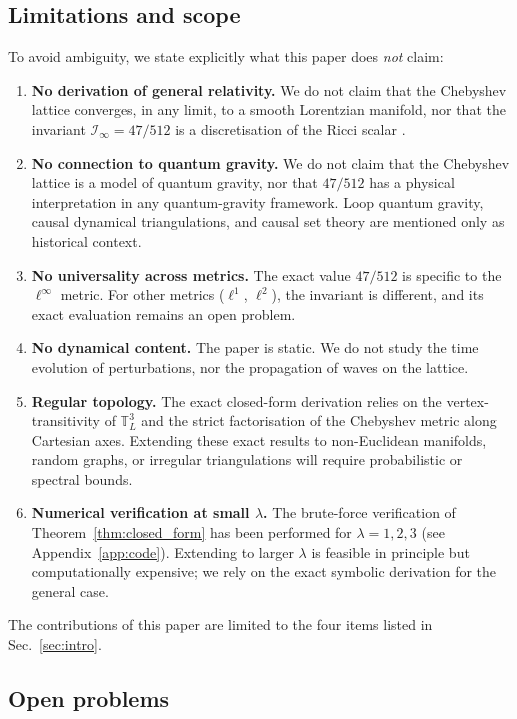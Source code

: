 \documentclass[aps,pre,onecolumn,10pt,groupedaddress,amsmath,amssymb,floatfix]{revtex4-2}
\begin{document}
\subsection{Limitations and scope}
\label{sec:scope}

To avoid ambiguity, we state explicitly what this paper does \emph{not} claim:
\begin{enumerate}
\item \textbf{No derivation of general relativity.} We do not claim that the Chebyshev lattice converges, in any limit, to a smooth Lorentzian manifold, nor that the invariant $\mathcal{I}_\infty = 47/512$ is a discretisation of the Ricci scalar \cite{docarmo1992riemannian}.
\item \textbf{No connection to quantum gravity.} We do not claim that the Chebyshev lattice is a model of quantum gravity, nor that $47/512$ has a physical interpretation in any quantum-gravity framework. Loop quantum gravity, causal dynamical triangulations, and causal set theory are mentioned only as historical context.
\item \textbf{No universality across metrics.} The exact value $47/512$ is specific to the $\ell^\infty$ metric. For other metrics ($\ell^1$, $\ell^2$), the invariant is different, and its exact evaluation remains an open problem.
\item \textbf{No dynamical content.} The paper is static. We do not study the time evolution of perturbations, nor the propagation of waves on the lattice.
\item \textbf{Regular topology.} The exact closed-form derivation relies on the vertex-transitivity of $\mathbb{T}^3_L$ and the strict factorisation of the Chebyshev metric along Cartesian axes. Extending these exact results to non-Euclidean manifolds, random graphs, or irregular triangulations will require probabilistic or spectral bounds.
\item \textbf{Numerical verification at small $\lambda$.} The brute-force verification of Theorem~\ref{thm:closed_form} has been performed for $\lambda = 1, 2, 3$ (see Appendix~\ref{app:code}). Extending to larger $\lambda$ is feasible in principle but computationally expensive; we rely on the exact symbolic derivation for the general case.
\end{enumerate}
The contributions of this paper are limited to the four items listed in Sec.~\ref{sec:intro}.

\subsection{Open problems}
\label{sec:open_problems}
\end{document}
